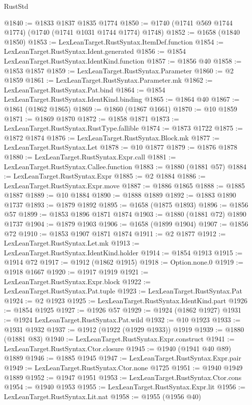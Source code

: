 \begin{lexlean}{RustStd}
\begin{coremodule}
@1840 := @1833 @1837 @1835 @1774
@1850 := @1740 (@1741 @569 @1744 @1774) (@1740 (@1741 @1031 @1744 @1774) @1748)
@1852 := @1658 (@1840 @1850)
@1853 := LexLeanTarget.RustSyntax.ItemDef.function
@1854 := LexLeanTarget.RustSyntax.Ident.generated
@1856 := @1854 LexLeanTarget.RustSyntax.IdentKind.function
@1857 := @1856 @40
@1858 := @1853 @1857
@1859 := LexLeanTarget.RustSyntax.Parameter
@1860 := @2 @1859
@1861 := LexLeanTarget.RustSyntax.Parameter.mk
@1862 := LexLeanTarget.RustSyntax.Pat.bind
@1864 := @1854 LexLeanTarget.RustSyntax.IdentKind.binding
@1865 := @1864 @40
@1867 := @1861 (@1862 @1865)
@1869 := @1860 (@1867 @1661)
@1870 := @10 @1859
@1871 := @1869 @1870
@1872 := @1858 @1871
@1873 := LexLeanTarget.RustSyntax.RustType.fallible
@1874 := @1873 @1722
@1875 := @1872 @1874
@1876 := LexLeanTarget.RustSyntax.Block.mk
@1877 := LexLeanTarget.RustSyntax.Let
@1878 := @10 @1877
@1879 := @1876 @1878
@1880 := LexLeanTarget.RustSyntax.Expr.call
@1881 := LexLeanTarget.RustSyntax.Callee.function
@1883 := @1880 (@1881 @57)
@1884 := LexLeanTarget.RustSyntax.Expr
@1885 := @2 @1884
@1886 := LexLeanTarget.RustSyntax.Expr.move
@1887 := @1886 @1865
@1888 := @1885 @1887
@1889 := @10 @1884
@1890 := @1888 @1889
@1892 := @1883 @1890 @1737
@1893 := @1879 @1892
@1895 := @1658 (@1875 @1893)
@1896 := @1856 @57
@1899 := @1853 @1896 @1871 @1874
@1903 := @1880 (@1881 @72) @1890 @1737
@1904 := @1879 @1903
@1906 := @1658 (@1899 @1904)
@1907 := @1856 @72
@1910 := @1853 @1907 @1871 @1874
@1911 := @2 @1877
@1912 := LexLeanTarget.RustSyntax.Let.mk
@1913 := LexLeanTarget.RustSyntax.IdentKind.holder
@1914 := @1854 @1913
@1915 := @1914 @72
@1917 := @1912 (@1862 @1915)
@1918 := Option.none.{0}
@1919 := @1918 @1667
@1920 := @1917 @1919
@1921 := LexLeanTarget.RustSyntax.Expr.block
@1922 := LexLeanTarget.RustSyntax.Pat.tuple
@1923 := LexLeanTarget.RustSyntax.Pat
@1924 := @2 @1923
@1925 := LexLeanTarget.RustSyntax.IdentKind.part
@1926 := @1854 @1925
@1927 := @1926 @57
@1929 := @1924 (@1862 @1927)
@1931 := @1924 LexLeanTarget.RustSyntax.Pat.wild
@1932 := @10 @1923
@1933 := @1931 @1932
@1937 := @1912 (@1922 (@1929 @1933)) @1919
@1939 := @1880 (@1881 @83)
@1940 := LexLeanTarget.RustSyntax.Expr.construct
@1941 := LexLeanTarget.RustSyntax.Ctor.closure
@1945 := @1940 (@1941 @40 @89) @1889
@1946 := @1885 @1945
@1947 := LexLeanTarget.RustSyntax.Expr.pair
@1949 := LexLeanTarget.RustSyntax.Ctor.none @1725
@1951 := @1940 @1949 @1889
@1952 := @1947 @1951
@1953 := LexLeanTarget.RustSyntax.Ctor.cons
@1954 := @1940 @1953
@1955 := LexLeanTarget.RustSyntax.Expr.lit
@1956 := LexLeanTarget.RustSyntax.Lit.nat
@1958 := @1955 (@1956 @40)

\end{coremodule}
\end{lexlean}
